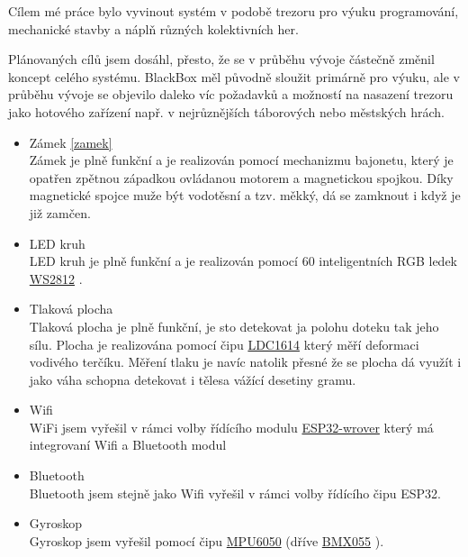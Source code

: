 Cílem mé práce bylo vyvinout systém v podobě trezoru pro výuku programování, mechanické stavby a náplň různých kolektivních her. 

Plánovaných cílů jsem dosáhl, přesto, že se v průběhu vývoje částečně změnil koncept celého systému. BlackBox měl původně sloužit primárně pro výuku, ale v průběhu vývoje 
se objevilo daleko víc požadavků a možností na nasazení trezoru jako hotového zařízení např. v nejrůznějších táborových nebo městských hrách. %

\begin{itemize}
    \item Zámek \ref{zamek} \\ Zámek je plně funkční a je realizován pomocí mechanizmu bajonetu, který je opatřen zpětnou západkou ovládanou motorem a magnetickou spojkou. 
        Díky magnetické spojce muže být vodotěsní a tzv. měkký, dá se zamknout i když je již zamčen. 
    \item LED kruh \\ LED kruh je plně funkční a je realizován pomocí 60 inteligentních RGB ledek \href{https://cdn-shop.adafruit.com/datasheets/WS2812B.pdf}{WS2812} \parencite{WS2812}.
    \item Tlaková plocha \\ Tlaková plocha je plně funkční, je sto detekovat ja polohu doteku tak jeho sílu. Plocha je realizována pomocí čipu \href{https://www.ti.com/lit/ds/symlink/ldc1612.pdf?ts=1612018658531&ref_url=https%253A%252F%252Fwww.google.com%252F}{LDC1614} \parencite{LDC1614} který měří deformaci
        vodivého terčíku. Měření tlaku je navíc natolik přesné že se plocha dá využít i jako váha schopna detekovat i tělesa vážící desetiny gramu. %
    \item Wifi \\ WiFi jsem vyřešil v rámci volby řídícího modulu \href{https://www.espressif.com/sites/default/files/documentation/esp32-wrover-b_datasheet_en.pdf}{ESP32-wrover} \parencite{ESP32-WROVER-B} 
            který má integrovaní Wifi a Bluetooth modul
    \item Bluetooth \\ Bluetooth jsem stejně jako Wifi vyřešil v rámci volby řídícího čipu ESP32.
    \item Gyroskop \\ Gyroskop jsem vyřešil pomocí čipu \href{https://datasheet.lcsc.com/szlcsc/TDK-InvenSense-MPU-6050_C24112.pdf}{MPU6050} (dříve \href{https://datasheet.lcsc.com/szlcsc/Bosch-Sensortec-BMX055_C94022.pdf}{BMX055} \parencite{bmx055}).

\end{itemize}
